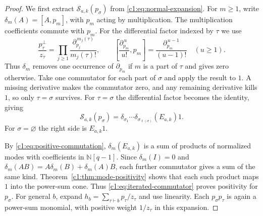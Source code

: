 \documentclass[12pt,reqno,a4paper]{amsart}
\numberwithin{equation}{section}
\numberwithin{figure}{section}
\theoremstyle{plain}
\theoremstyle{definition}
\begin{document}
\begin{proof}
We first extract $\mathcal S_{a,k}(p_\sigma)$ from
\eqref{c1:eq:normal-expansion}.  For $m\geq1$, write
$\delta_m(A)=[A,p_m]$, with $p_m$ acting by multiplication.
The multiplication coefficients commute with $p_m$.  For the
differential factor indexed by $\tau$ we use
\[
 \frac{p_\tau^\perp}{z_\tau}
 =\prod_{j\geq1}\frac{\partial_{p_j}^{\,m_j(\tau)}}{m_j(\tau)!},
 \qquad
 \left[\frac{\partial_{p_m}^{\,u}}{u!},p_m\right]
 =\frac{\partial_{p_m}^{\,u-1}}{(u-1)!}\quad(u\geq1).
\]
Thus $\delta_m$ removes one occurrence of $\partial_{p_m}$ if
$m$ is a part of $\tau$ and gives zero otherwise.
Take one commutator for each part of $\sigma$ and apply the result
to $1$.  A missing derivative makes the commutator zero, and any
remaining derivative kills $1$, so only $\tau=\sigma$ survives.
For $\tau=\sigma$ the differential factor becomes the identity, giving
\begin{equation}\label{c1:eq:iterated-commutator}
 \mathcal S_{a,k}(p_\sigma)
 =\delta_{\sigma_1}\cdots
   \delta_{\sigma_{\ell(\sigma)}}(E_{a,k})1.
\end{equation}
For $\sigma=\varnothing$ the right side is $E_{a,k}1$.

By \eqref{c1:eq:positive-commutation}, $\delta_m(E_{a,k})$ is a sum
of products of normalized modes with coefficients in $\mathbb N[q-1]$.
Since $\delta_m(I)=0$ and $\delta_m(AB)=A\delta_m(B)+\delta_m(A)B$,
each further commutator gives a sum of the same kind.
Theorem~\ref{c1:thm:mode-positivity} shows that each such product
maps $1$ into the power-sum cone.  Thus \eqref{c1:eq:iterated-commutator}
proves positivity for $p_\sigma$.  For general $b$, expand
$h_b=\sum_{\tau\vdash b}p_\tau/z_\tau$ and use linearity.  Each
$p_\sigma p_\tau$ is again a power-sum monomial, with positive
weight $1/z_\tau$ in this expansion.


\end{proof}
\end{document}
